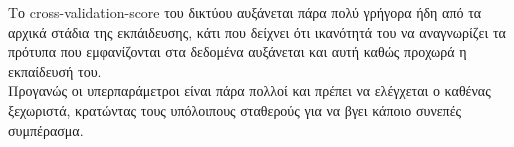 \documentclass[11pt]{article} %
\begin{document}
Το cross-validation-score του δικτύου αυξάνεται πάρα πολύ γρήγορα ήδη από τα αρχικά στάδια της εκπάιδευσης, κάτι που δείχνει ότι ικανότητά του να αναγνωρίζει τα πρότυπα που εμφανίζονται στα δεδομένα αυξάνεται και αυτή καθώς προχωρά η εκπαίδευσή του.\\

Προγανώς οι υπερπαράμετροι είναι πάρα πολλοί και πρέπει να ελέγχεται ο καθένας ξεχωριστά, κρατώντας τους υπόλοιπους σταθερούς για να βγει κάποιο συνεπές συμπέρασμα.\\

 
\end{document}
